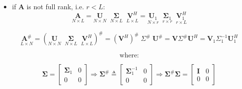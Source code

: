 \begin{itemize}
\begin{align*}
&= \left(\mathbf{V}_1 \mathbf{\Sigma}_1^2 \mathbf{V}_1^{H}\right)^{-1} \mathbf{V}_1 \mathbf{\Sigma}_1 \mathbf{U}_1^{H} = \mathbf{V}_1 \mathbf{\Sigma}_1^{-2} \mathbf{V}_1^{H} \mathbf{V}_1 \mathbf{\Sigma}_1 \mathbf{U}_1^{H}\\
&= \mathbf{V}_1 \mathbf{\Sigma}_1^{-1} \mathbf{U}_1^{H}
\end{align*}
\vspace{-0.5em}
\begin{align*}
\mathbf{A}^{\#} \mathbf{A}
&= \mathbf{V}_1 \mathbf{\Sigma}_1^{-1} \mathbf{U}_1^{H} \mathbf{U}_1 \mathbf{\Sigma}_1 \mathbf{V}_1^{H}= \mathbf{V}_1 \mathbf{V}_1^{H} = \mathbf{I}_{L\times L}
\end{align*}
\newpage
\item if \textbf{A} is not full rank, i.e. \(r<L\):
\[
\underset{N \times L}{\mathbf{A}}
=
\underset{N \times N}{\mathbf{U}}
\;\;
\underset{N \times L}{\mathbf{\Sigma}}
\;\;
\underset{L \times L}{\mathbf{V}^H}
=
\underset{N \times r}{\mathbf{U}_1}
\;\;
\underset{r \times r}{\mathbf{\Sigma}_1}
\;\;
\underset{r \times L}{\mathbf{V}_1^H}
\]

\[
\underset{L \times N}{\mathbf{A}^{\#}}
=
\left(
\underset{N \times N}{\mathbf{U}}
\;\;
\underset{N \times L}{\mathbf{\Sigma}}
\;\;
\underset{L \times L}{\mathbf{V}^H}
\right)^{\#}
=
\left(\mathbf{V}^H\right)^{\#}
\;
\Sigma^{\#}
\;
\mathbf{U}^{\#}
=
\mathbf{V} \Sigma^{\#} \mathbf{U}^H
=
\mathbf{V}_1 \Sigma_1^{-1} \mathbf{U}_1^H
\]

\[
\text{where:}
\]

\[
\boldsymbol{\Sigma} =
\begin{bmatrix}
\boldsymbol{\Sigma}_1 & 0 \\
0 & 0
\end{bmatrix}
\Longrightarrow
\boldsymbol{\Sigma}^{\#} \triangleq
\begin{bmatrix}
\boldsymbol{\Sigma}_1^{-1} & 0 \\
0 & 0
\end{bmatrix}
\Longrightarrow
\boldsymbol{\Sigma}^{\#}\boldsymbol{\Sigma} =
\begin{bmatrix}
\mathbf{I} & 0 \\
0 & 0
\end{bmatrix}
\]


\end{itemize}
